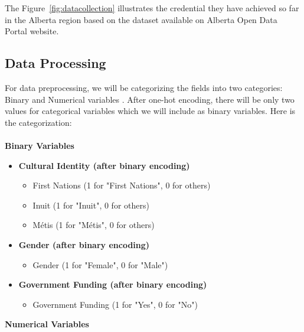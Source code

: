 \documentclass[a4paper,twoside]{article}
\begin{document}
The Figure~\ref{fig:datacollection} illustrates the credential they have achieved so far in the Alberta region based on the dataset available on Alberta Open Data Portal website.


\subsection{Data Processing}
For data preprocessing, we will be categorizing the fields into two categories:
Binary and Numerical variables \cite{Mallikharjuna23}. After one-hot encoding, there will be
only two values for categorical variables which we will include as binary
variables. Here is the categorization:
\\
\\
\textbf{Binary Variables}

\begin{itemize}
    \item \textbf{Cultural Identity (after binary encoding)}
    \begin{itemize}
        \item First Nations (1 for "First Nations", 0 for others)
        \item Inuit (1 for "Inuit", 0 for others)
        \item Métis (1 for "Métis", 0 for others)
    \end{itemize}

    \item \textbf{Gender (after binary encoding)}
    \begin{itemize}
        \item Gender (1 for "Female", 0 for "Male")
    \end{itemize}

    \item \textbf{Government Funding (after binary encoding)}
    \begin{itemize}
        \item Government Funding (1 for "Yes", 0 for "No")
    \end{itemize}
\end{itemize}

\textbf{Numerical Variables}
\end{document}
